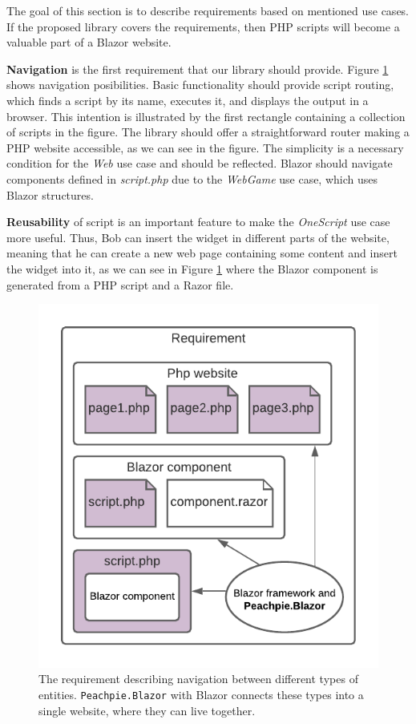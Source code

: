 The goal of this section is to describe requirements based on mentioned use cases.
If the proposed library covers the requirements, then PHP scripts will become a valuable part of a Blazor website.
\par
\textbf{Navigation} is the first requirement that our library should provide.
Figure \ref{img10:scripts} shows navigation posibilities.
Basic functionality should provide script routing, which finds a script by its name, executes it, and displays the output in a browser.
This intention is illustrated by the first rectangle containing a collection of scripts in the figure.
The library should offer a straightforward router making a PHP website accessible, as we can see in the figure.
The simplicity is a necessary condition for the \textit{Web} use case and should be reflected.
Blazor should navigate components defined in \textit{script.php} due to the \textit{WebGame} use case, which uses Blazor structures.
\par
\textbf{Reusability} of script is an important feature to make the \textit{OneScript} use case more useful.
Thus, Bob can insert the widget in different parts of the website, meaning that he can create a new web page containing some content and insert the widget into it, as we can see in Figure \ref{img10:scripts} where the Blazor component is generated from a PHP script and a Razor file.
\par
\begin{figure}
\centering
\includegraphics{./img/Requirement}
\caption{The requirement describing navigation between different types of entities. 
\texttt{Peachpie.Blazor} with Blazor connects these types into a single website, where they can live together.
}
\label{img10:scripts}
\end{figure} 
